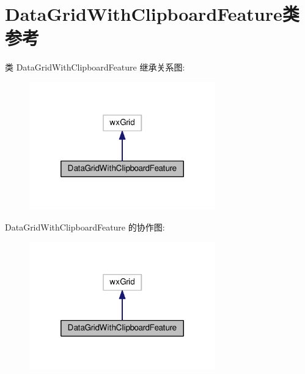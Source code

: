 \hypertarget{class_data_grid_with_clipboard_feature}{\section{Data\+Grid\+With\+Clipboard\+Feature类 参考}
\label{class_data_grid_with_clipboard_feature}
}


类 Data\+Grid\+With\+Clipboard\+Feature 继承关系图\+:
\nopagebreak
\begin{figure}[H]
\begin{center}
\leavevmode
\includegraphics[width=228pt]{class_data_grid_with_clipboard_feature__inherit__graph}
\end{center}
\end{figure}


Data\+Grid\+With\+Clipboard\+Feature 的协作图\+:
\nopagebreak
\begin{figure}[H]
\begin{center}
\leavevmode
\includegraphics[width=228pt]{class_data_grid_with_clipboard_feature__coll__graph}
\end{center}
\end{figure}
